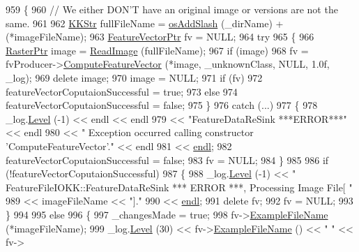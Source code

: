 \begin{DoxyCode}
959     \{
960       \textcolor{comment}{// We either  DON'T have an original image    or    versions are not the same.}
961 
962       \hyperlink{class_k_k_b_1_1_k_k_str}{KKStr}  fullFileName = \hyperlink{namespace_k_k_b_aa0d40119b911df4283399a1724cab1ef}{osAddSlash} (\_dirName) + (*imageFileName);
963       \hyperlink{class_k_k_m_l_l_1_1_feature_vector}{FeatureVectorPtr} fv = NULL;
964       \textcolor{keywordflow}{try}
965       \{
966         \hyperlink{class_k_k_b_1_1_raster}{RasterPtr} image = \hyperlink{namespace_k_k_b_ac16e808442fd255d2b7d09df8f11ae07}{ReadImage} (fullFileName);
967         \textcolor{keywordflow}{if}  (image)
968           fv = fvProducer->\hyperlink{class_k_k_m_l_l_1_1_feature_vector_producer_a8f93296a46432624867b12ed8631df0f}{ComputeFeatureVector} (*image, \_unknownClass, NULL, 1.0f, 
      \_log);
969         \textcolor{keyword}{delete} image;
970         image = NULL;
971         \textcolor{keywordflow}{if}  (fv)
972           featureVectorCoputaionSuccessful = \textcolor{keyword}{true};
973         \textcolor{keywordflow}{else}
974           featureVectorCoputaionSuccessful = \textcolor{keyword}{false};
975       \}
976       \textcolor{keywordflow}{catch}  (...)
977       \{
978         \_log.\hyperlink{class_k_k_b_1_1_run_log_a32cf761d7f2e747465fd80533fdbb659}{Level} (-1) << endl << endl
979           << \textcolor{stringliteral}{"FeatureDataReSink   ***ERROR***"}  << endl
980           << \textcolor{stringliteral}{"       Exception occurred calling constructor 'ComputeFeatureVector'."} << endl
981           << \hyperlink{namespace_k_k_b_ad1f50f65af6adc8fa9e6f62d007818a8}{endl};
982         featureVectorCoputaionSuccessful = \textcolor{keyword}{false};
983         fv = NULL;
984       \}
985 
986       \textcolor{keywordflow}{if}  (!featureVectorCoputaionSuccessful)
987       \{
988         \_log.\hyperlink{class_k_k_b_1_1_run_log_a32cf761d7f2e747465fd80533fdbb659}{Level} (-1) << \textcolor{stringliteral}{" FeatureFileIOKK::FeatureDataReSink  *** ERROR ***, Processing Image File[
      "}
989                        << imageFileName << \textcolor{stringliteral}{"]."}
990                        << \hyperlink{namespace_k_k_b_ad1f50f65af6adc8fa9e6f62d007818a8}{endl};
991         \textcolor{keyword}{delete}  fv;
992         fv = NULL;
993       \}
994 
995       \textcolor{keywordflow}{else}
996       \{
997         \_changesMade = \textcolor{keyword}{true};
998         fv->\hyperlink{class_k_k_m_l_l_1_1_feature_vector_ab47c89ab1e9396664fdc0dc34b6e1ab5}{ExampleFileName} (*imageFileName);
999         \_log.\hyperlink{class_k_k_b_1_1_run_log_a32cf761d7f2e747465fd80533fdbb659}{Level} (30) << fv->\hyperlink{class_k_k_m_l_l_1_1_feature_vector_ab47c89ab1e9396664fdc0dc34b6e1ab5}{ExampleFileName} () << \textcolor{stringliteral}{"  "} << fv->

\end{DoxyCode}
